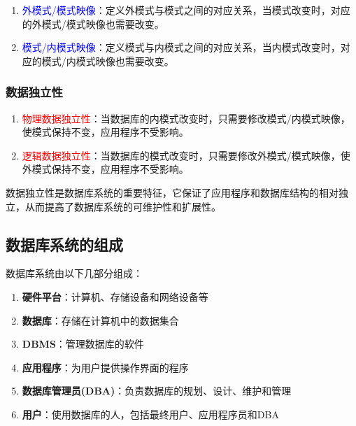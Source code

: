 \documentclass{../../note}
\begin{document}
\begin{enumerate}
  \item \textcolor{blue}{外模式/模式映像}：定义外模式与模式之间的对应关系，当模式改变时，对应的外模式/模式映像也需要改变。

  \item \textcolor{blue}{模式/内模式映像}：定义模式与内模式之间的对应关系，当内模式改变时，对应的模式/内模式映像也需要改变。
\end{enumerate}

\subsubsection{数据独立性}

\begin{enumerate}
  \item \textcolor{red}{物理数据独立性}：当数据库的内模式改变时，只需要修改模式/内模式映像，使模式保持不变，应用程序不受影响。

  \item \textcolor{red}{逻辑数据独立性}：当数据库的模式改变时，只需要修改外模式/模式映像，使外模式保持不变，应用程序不受影响。
\end{enumerate}

数据独立性是数据库系统的重要特征，它保证了应用程序和数据库结构的相对独立，从而提高了数据库系统的可维护性和扩展性。

\subsection{数据库系统的组成}

数据库系统由以下几部分组成：

\begin{enumerate}
  \item \textbf{硬件平台}：计算机、存储设备和网络设备等

  \item \textbf{数据库}：存储在计算机中的数据集合

  \item \textbf{DBMS}：管理数据库的软件

  \item \textbf{应用程序}：为用户提供操作界面的程序

  \item \textbf{数据库管理员(DBA)}：负责数据库的规划、设计、维护和管理

  \item \textbf{用户}：使用数据库的人，包括最终用户、应用程序员和DBA
\end{enumerate}
\end{document}
